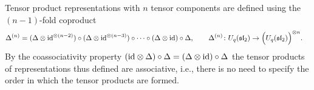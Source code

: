 \documentclass[oneside,english]{amsart}
\numberwithin{equation}{section}
\numberwithin{figure}{section}
\theoremstyle{plain}
\theoremstyle{plain}
\theoremstyle{plain}
\theoremstyle{remark}
\theoremstyle{plain}
\theoremstyle{plain}
\theoremstyle{plain}
\theoremstyle{plain}
\theoremstyle{plain}
\theoremstyle{plain}
\theoremstyle{plain}
\theoremstyle{plain}
\newcommand{\alexmod}[1]{{\color{allucol} #1}}
\begin{document}
Tensor product representations with 
$n$ tensor components are defined using the $(n-1)$-fold coproduct
\begin{align*}
\Delta^{(n)} = \; & (\Delta\otimes\mathrm{id}^{\otimes(n-2)})\circ(\Delta\otimes\mathrm{id}^{\otimes(n-3)})\circ\cdots
\circ(\Delta\otimes\mathrm{id})\circ\Delta ,
\qquad \Delta^{(n)} \colon{U}_{q}(\mathfrak{sl}_{2})\rightarrow\Big({U}_{q}(\mathfrak{sl}_{2})\Big)^{\otimes n} .
\end{align*}
By the coassociativity property 
$(\mathrm{id}\otimes\Delta)\circ\Delta = (\Delta\otimes\mathrm{id})\circ\Delta$ 
the tensor products of representations thus defined are associative, i.e.,
there is no need to specify the order in which the tensor products are formed.
\end{document}
